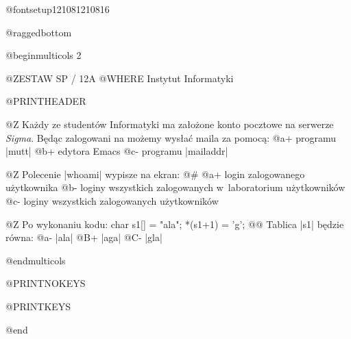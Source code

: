 



@fontsetup{12}{10}{8}{12}{10}{8}{16}

@raggedbottom

@beginmulticols 2

@ZESTAW SP / 12A
@WHERE  Instytut Informatyki

@PRINTHEADER

@Z Każdy ze studentów Informatyki ma założone konto pocztowe na
   serwerze {\it Sigma}. 
   Będąc zalogowani na  możemy wysłać maila za
   pomocą:
@a+  programu |mutt|
@b+  edytora Emacs
@c-  programu |mailaddr|

@Z Polecenie |whoami| wypisze na ekran:
@#
@a+ login zalogowanego użytkownika
@b- loginy wszystkich zalogowanych w~laboratorium użytkowników
@c- loginy wszystkich zalogowanych użytkowników

@Z Po wykonaniu kodu:
\verbatim@@
char s1[] = "ala";
*(s1+1) = 'g';
@@
Tablica |s1| będzie równa:
@a- |ala|
@B+ |aga|
@C- |gla|

@endmulticols

@PRINTNOKEYS

@PRINTKEYS

@end
